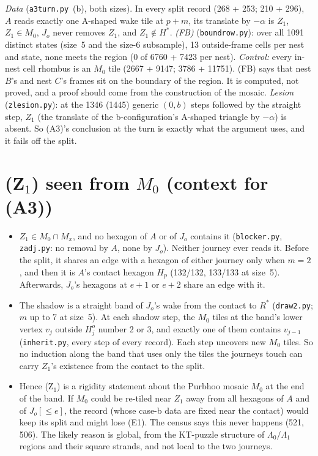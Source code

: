 \documentclass[11pt]{article}
\theoremstyle{definition}\newtheorem{definition}[theorem]{Definition}\newtheorem{remark}[theorem]{Remark}
\begin{document}
\noindent\emph{Data} (\texttt{a3turn.py}~(b), both sizes). In every split record (268 + 253; 210 + 296), $A$ reads exactly one A-shaped wake tile at $p+m$, its translate by $-\alpha$ is $Z_1$, $Z_1\in M_0$, $J_o$ never removes $Z_1$, and $Z_1\notin H^\ast$. \emph{(FB)} (\texttt{boundrow.py}): over all 1091 distinct states (size~5 and the size-6 subsample), 13 outside-frame cells per nest and state, none meets the region (0 of 6760 + 7423 per nest). \emph{Control:} every in-nest cell rhombus is an $M_0$ tile (2667 + 9147; 3786 + 11751). (FB) says that nest $B$'s and nest $C$'s frames sit on the boundary of the region. It is computed, not proved, and a proof should come from the construction of the mosaic. \emph{Lesion} (\texttt{zlesion.py}): at the 1346 (1445) generic $(0,b)$ steps followed by the straight step, $Z_1$ (the translate of the b-configuration's A-shaped triangle by $-\alpha$) is absent. So (A3)'s conclusion at the turn is exactly what the argument uses, and it fails off the split.

\section{(Z$_1$) seen from $M_0$ (context for (A3))}\label{sec:gap}
\begin{itemize}
\item $Z_1\in M_0\cap M_x$, and no hexagon of $A$ or of $J_o$ contains it (\texttt{blocker.py}, \texttt{zadj.py}: no removal by $A$, none by $J_o$). Neither journey ever reads it. Before the split, it shares an edge with a hexagon of either journey only when $m=2$, and then it is $A$'s contact hexagon $H_p$ (132/132, 133/133 at size~5). Afterwards, $J_o$'s hexagons at $e+1$ or $e+2$ share an edge with it.
\item The shadow is a straight band of $J_o$'s wake from the contact to $R^\ast$ (\texttt{draw2.py}; $m$ up to 7 at size~5). At each shadow step, the $M_0$ tiles at the band's lower vertex $v_j$ outside $H^o_j$ number 2 or 3, and exactly one of them contains $v_{j-1}$ (\texttt{inherit.py}, every step of every record). Each step uncovers new $M_0$ tiles. So no induction along the band that uses only the tiles the journeys touch can carry $Z_1$'s existence from the contact to the split.
\item Hence (Z$_1$) is a rigidity statement about the Purbhoo mosaic $M_0$ at the end of the band. If $M_0$ could be re-tiled near $Z_1$ away from all hexagons of $A$ and of $J_o[{\le}e]$, the record (whose case-b data are fixed near the contact) would keep its split and might lose (E1). The census says this never happens (521, 506). The likely reason is global, from the KT-puzzle structure of $\Lambda_0/\Lambda_1$ regions and their square strands, and not local to the two journeys.
\end{itemize}
\end{document}
